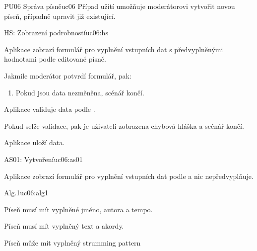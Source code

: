 \begin{usecase}{PU06 Správa písně}{uc06}
    Případ užití umožňuje moderátorovi vytvořit novou píseň, případně upravit již existující.

    \begin{scenario}{HS: Zobrazení podrobností}{uc06:hs}
        \item Aplikace zobrazí formulář pro vyplnění vstupních dat s předvyplněnými hodnotami podle editované písně.
        \item Jakmile moderátor potvrdí formulář, pak:
        \begin{enumerate}
            \item Pokud jsou data nezměněna, scénář končí.
        \end{enumerate}
        \item Aplikace validuje data podle .
        \item Pokud selže validace, pak je uživateli zobrazena chybová hláška a scénář končí.
        \item Aplikace uloží data.
    \end{scenario}

    \begin{scenario}{AS01: Vytvoření}{uc06:as01}
        \item Aplikace zobrazí formulář pro vyplnění vstupních dat podle  a nic nepředvyplňuje.
    \end{scenario}

    \begin{scenario}{Alg.1}{uc06:alg1}
        \item Píseň musí mít vyplněné jméno, autora a tempo.
        \item Píseň musí mít vyplněný text a akordy.
        \item Píseň může mít vyplněný strumming pattern
    \end{scenario}
\end{usecase}
